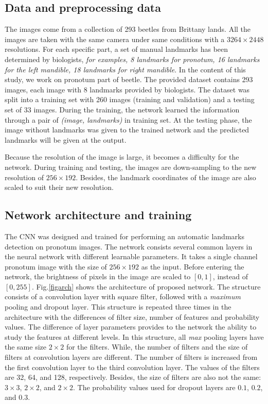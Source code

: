 \documentclass[conference]{IEEEtran}
\begin{document}
\subsection{Data and preprocessing data}
The images come from a collection of 293 beetles from Brittany lands. All the images are taken with the same camera under same conditions with a $3264 \times 2448$ resolutions. For each specific part, a set of manual landmarks has been determined by biologists, \textit{for examples, 8 landmarks for pronotum, 16 landmarks for the left mandible, 18 landmarks for right mandible}. In the content of this study, we work on pronotum part of beetle. The provided dataset contains 293 images, each image with 8 landmarks provided by biologists. The dataset was split into a training set with 260 images (training and validation) and a testing set of 33 images. During the training, the network learned the information through a pair of \textit{(image, landmarks)} in training set. At the testing phase, the image without landmarks was given to the trained network and the predicted landmarks will be given at the output.

Because the resolution of the image is large, it becomes a difficulty for the network. During training and testing, the images are down-sampling to the new resolution of $256 \times 192$. Besides, the landmark coordinates of the image are also scaled to suit their new resolution.
\subsection{Network architecture and training}
The CNN was designed and trained for performing an automatic landmarks detection on pronotum images. The network consists several common layers in the neural network with different learnable parameters. It takes a single channel pronotum image with the size of  $256 \times 192$ as the input. Before entering the network, the brightness of pixels in the image are scaled to $[0,1]$, instead of $[0,255]$. Fig.\ref{figarch} shows the architecture of proposed network. The structure consists of a convolution layer with square filter, followed with a \textit{maximum} pooling and dropout layer. This structure is repeated three times in the architecture with the differences of filter size, number of features and probability values. The difference of layer parameters provides to the network the ability to study the features at different levels. In this structure, all \textit{max} pooling layers have the same size $2 \times 2$ for the filters. While, the number of filters and the size of filters at convolution layers are different. The number of filters is increased from the first convolution layer to the third convolution layer. The values of the filters are 32, 64, and 128, respectively. Besides, the size of filters are also not the same: $3 \times 3$, $2 \times 2$, and $2 \times 2$. The probability values used for dropout layers are $0.1$, $0.2$, and $0.3$.
\end{document}
